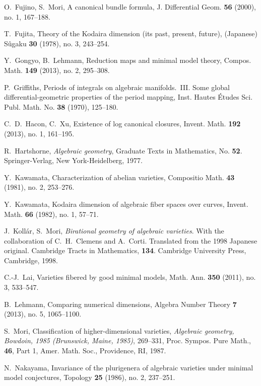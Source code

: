 \documentclass[12pt,twoside]{amsart}
\theoremstyle{definition}
\begin{document}
\begin{thebibliography}{BCHM}
O.~Fujino, S.~Mori, 
A canonical bundle formula, 
J. Differential Geom. {\textbf{56}} (2000), no. 1, 167--188.

T.~Fujita, Theory of the Kodaira dimension (its past, present, future), 
(Japanese) S\^ugaku {\textbf{30}} (1978), no. 3, 243--254.

Y.~Gongyo, B.~Lehmann, 
Reduction maps and minimal model theory, 
Compos. Math. {\textbf{149}} (2013), no. 2, 295--308.

P.~Griffiths, 
Periods of integrals on algebraic manifolds.~III. Some 
global differential-geometric properties of the period mapping, 
Inst. Hautes \'Etudes Sci. Publ. Math. No. {\textbf{38}} (1970), 125--180.

C.~D.~Hacon, C.~Xu, 
Existence of log canonical closures, 
Invent. Math. {\textbf{192}} (2013), no. 1, 161--195.

R.~Hartshorne, 
{\em{Algebraic geometry}}, 
Graduate Texts in Mathematics, No. {\textbf{52}}. Springer-Verlag, 
New York-Heidelberg, 1977.

Y.~Kawamata, Characterization of abelian varieties, 
Compositio Math. {\textbf{43}} (1981), no. 2, 253--276. 

Y.~Kawamata, 
Kodaira dimension of algebraic fiber spaces over curves, 
Invent. Math. {\textbf{66}} (1982), no. 1, 57--71. 

J.~Koll\'ar, S.~Mori, 
{\em{Birational geometry of algebraic varieties}}. With 
the collaboration of C.~H.~Clemens and A.~Corti. Translated 
from the 1998 Japanese original. Cambridge 
Tracts in Mathematics, {\textbf{134}}. Cambridge University 
Press, Cambridge, 1998.

C.-J.~Lai, 
Varieties fibered by good minimal models, 
Math. Ann. {\textbf{350}} (2011), no. 3, 533--547. 

B.~Lehmann, 
Comparing numerical dimensions, 
Algebra Number Theory {\textbf{7}} (2013), no. 5, 1065--1100.

S.~Mori, 
Classification of higher-dimensional varieties, 
{\em{Algebraic geometry, Bowdoin, 1985 (Brunswick, Maine, 1985)}}, 
269--331, 
Proc. Sympos. Pure Math., {\textbf{46}}, 
Part 1, Amer. Math. Soc., Providence, RI, 1987.

N.~Nakayama, 
Invariance of the plurigenera of algebraic 
varieties under minimal model conjectures, 
Topology {\textbf{25}} (1986), no. 2, 237--251.


\end{thebibliography}
\end{document}
